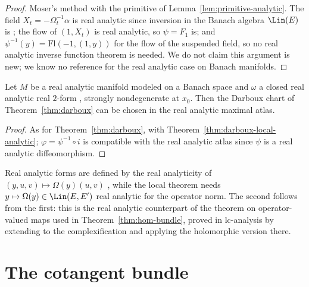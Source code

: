 \begin{proof}
  \leanok
  Moser's method with the primitive of Lemma~\ref{lem:primitive-analytic}. The field $X_t =
  -\Omega_t^{-1}\alpha$ is real analytic since inversion in the Banach algebra $\Lin(E)$ is
  \cite[Proposition~2.2.13]{GN26}; the flow of $(1, X_t)$ is real analytic, so $\psi = F_1$ is;
  and $\psi^{-1}(y) = \mathrm{Fl}(-1, (1, y))$ for the flow of the suspended field, so no real
  analytic inverse function theorem is needed. We do not claim this argument is new; we know no
  reference for the real analytic case on Banach manifolds.
\end{proof}

\begin{theorem}
  \label{thm:darboux-analytic}
  \leanok
  Let $M$ be a real analytic manifold modeled on a Banach space and $\omega$ a closed real
  analytic real $2$-form \cite[Remark~3.6.18]{GN26}, strongly nondegenerate at $x_0$. Then the Darboux chart of
  Theorem~\ref{thm:darboux} can be chosen in the real analytic maximal atlas.
\end{theorem}

\begin{proof}
  \leanok
  As for Theorem~\ref{thm:darboux}, with Theorem~\ref{thm:darboux-local-analytic}; $\varphi =
  \psi^{-1} \circ i$ is compatible with the real analytic atlas since $\psi$ is a real analytic
  diffeomorphism.
\end{proof}

\begin{remark}
  Real analytic forms are defined by the real analyticity of $(y, u, v) \mapsto \Omega(y)(u, v)$
  \cite[Remark~3.6.18]{GN26}, while the local theorem needs $y \mapsto \Omega(y) \in \Lin(E, E')$
  real analytic for the operator norm. The second follows from the first: this is the real
  analytic counterpart of the theorem on operator-valued maps used in
  Theorem~\ref{thm:hom-bundle}, proved in lc-analysis by extending to the complexification and
  applying the holomorphic version there.
\end{remark}

\section{The cotangent bundle}
\label{sec:cotangent-symplectic}

